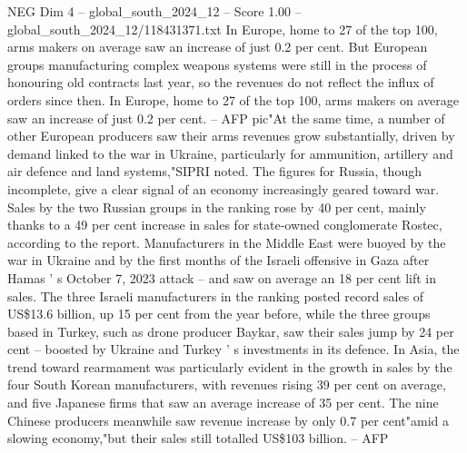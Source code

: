 \begin{textsample}{NEG Dim 4 – global\_south\_2024\_12 – Score 1.00 – global\_south\_2024\_12/118431371.txt}
In Europe, home to 27 of the top 100, arms makers on average saw an increase of just 0.2 per cent.
But European groups manufacturing complex weapons systems were still in the process of honouring old contracts last year, so the revenues do not reflect the influx of orders since then.
In Europe, home to 27 of the top 100, arms makers on average saw an increase of just 0.2 per cent. -- AFP pic"At the same time, a number of other European producers saw their arms revenues grow substantially, driven by demand linked to the war in Ukraine, particularly for ammunition, artillery and air defence and land systems,"SIPRI noted.
The figures for Russia, though incomplete, give a clear signal of an economy increasingly geared toward war.
Sales by the two Russian groups in the ranking rose by 40 per cent, mainly thanks to a 49 per cent increase in sales for state-owned conglomerate Rostec, according to the report.
Manufacturers in the Middle East were buoyed by the war in Ukraine and by the first months of the Israeli offensive in Gaza after Hamas ' s October 7, 2023 attack -- and saw on average an 18 per cent lift in sales.
The three Israeli manufacturers in the ranking posted record sales of US\$13.6 billion, up 15 per cent from the year before, while the three groups based in Turkey, such as drone producer Baykar, saw their sales jump by 24 per cent -- boosted by Ukraine and Turkey ' s investments in its defence.
In Asia, the trend toward rearmament was particularly evident in the growth in sales by the four South Korean manufacturers, with revenues rising 39 per cent on average, and five Japanese firms that saw an average increase of 35 per cent.
The nine Chinese producers meanwhile saw revenue increase by only 0.7 per cent"amid a slowing economy,"but their sales still totalled US\$103 billion. -- AFP

\end{textsample}
